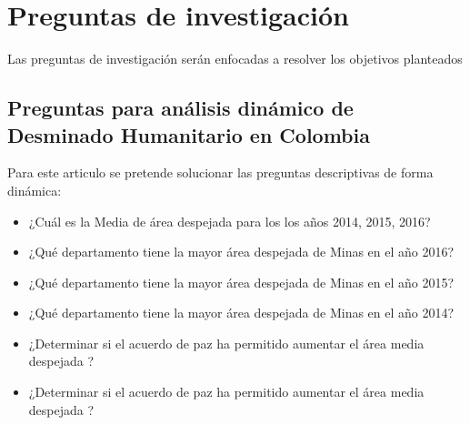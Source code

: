 

\section{Preguntas de investigación}
Las preguntas de investigación serán enfocadas a resolver los objetivos planteados
 \subsection{Preguntas para análisis dinámico de Desminado Humanitario en Colombia}
Para este articulo se pretende solucionar las preguntas descriptivas de  forma dinámica:
  \begin{itemize}
  \item ¿Cuál es la Media de área despejada para los los años  2014, 2015, 2016?
  \item ¿Qué departamento tiene la mayor área despejada de Minas en el año 2016?
  \item ¿Qué departamento tiene la mayor área despejada de Minas en el año 2015?
  \item ¿Qué departamento tiene la mayor área despejada de Minas en el año 2014?
  \item ¿Determinar si el acuerdo de paz ha permitido aumentar el área media despejada ?
    \item ¿Determinar si el acuerdo de paz ha permitido aumentar el área media despejada ?
  \end{itemize}